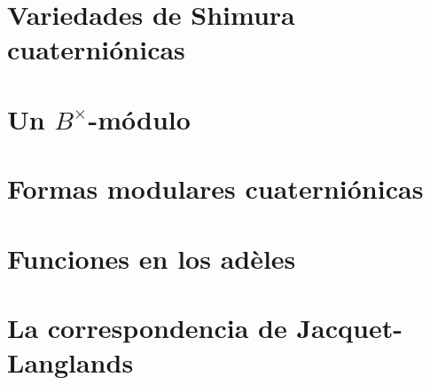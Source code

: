

\section{Variedades de Shimura cuaterni\'{o}nicas}%
	\label{sec:cuaternionicasvariedadesdeshimura}

\section{Un $B^{\times}$-m\'{o}dulo}\label{sec:cuaternionicasunbxmodulo}

\section{Formas modulares cuaterni\'{o}nicas}%
	\label{sec:cuaternionicasformasmodulares}

\section{Funciones en los ad\`{e}les}%
	\label{sec:cuaternionicasfuncionesenlosadeles}

\section{La correspondencia de Jacquet-Langlands}%
	\label{sec:correspondenciadejl}

% 
% 
% 
% 
